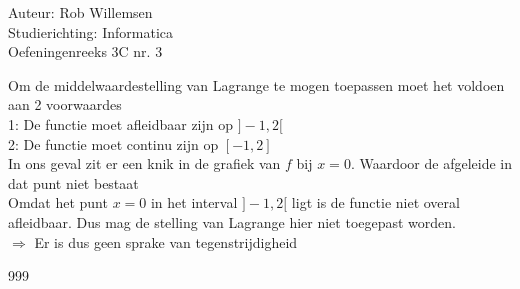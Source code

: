 \documentclass[a4paper]{article}
\begin{document}
\noindent \large Auteur: Rob Willemsen \\
\noindent \large Studierichting: Informatica \\
\noindent \large Oefeningenreeks 3C nr. 3 \\

\medskip

\normalsize

Om de middelwaardestelling van Lagrange te mogen toepassen moet het voldoen aan 2 voorwaardes \\

1: De functie moet afleidbaar zijn op $]-1, 2[$ \\

2: De functie moet continu zijn op $[-1, 2]$ \\

In ons geval zit er een knik in de grafiek van $f$ bij $x=0$. Waardoor de afgeleide in dat punt niet bestaat\\

Omdat het punt $x=0$ in het interval $]-1, 2[$ ligt is de functie niet overal afleidbaar. Dus mag de stelling van Lagrange hier niet toegepast worden. \\

$\Rightarrow$ Er is dus geen sprake van tegenstrijdigheid \\

\begin{thebibliography}{999}
\end{thebibliography}
\end{document}
